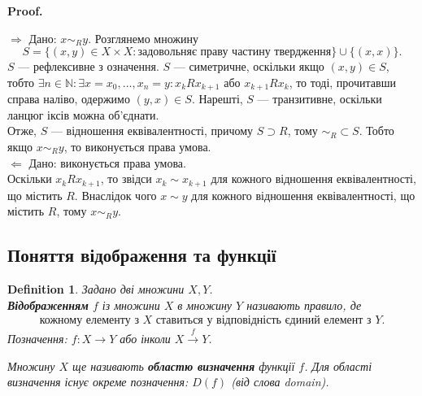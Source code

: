 \documentclass[a4paper, 14pt]{extarticle}
\makeatletter
\def\rightproof{$\boxed{\Rightarrow}$ }
\def\leftproof{$\boxed{\Leftarrow}$ }
\theoremstyle{theoremdd}
\theoremstyle{theoremdd}
\newtheorem{definition}[theorem]{Definition}
\theoremstyle{theoremdd}
\theoremstyle{theoremdd}
\theoremstyle{theoremdd}
\theoremstyle{theoremdd}
\theoremstyle{theoremdd}
\theoremstyle{theoremdd}
\theoremstyle{theoremdd}
\theoremstyle{theoremdd}
\theoremstyle{theoremdd}
\theoremstyle{theoremdd}
\theoremstyle{theoremdd}
\theoremstyle{theoremdd}
\theoremstyle{theoremdd}
\renewenvironment{proof}[1][Proof.\\]{\par
\pushQED{\hfill \qed}%
\normalfont \topsep6\p@\@plus6\p@\relax
\trivlist
\item\relax
{\bfseries
#1\@addpunct{.}}\hspace\labelsep\ignorespaces
}{%
\popQED\endtrivlist\@endpefalse
}
\makeatother
\begin{document}
\begin{proof}
\rightproof Дано: $x \sim_R y$. Розглянемо множину
\[
S = \{ (x,y) \in X \times X: \text{задовольняє праву частину твердження} \} \cup \{(x,x)\}.
\]
$S$ --- рефлексивне з означення. $S$ --- симетричне, оскільки якщо $(x,y) \in S$, тобто $\exists n \in \mathbb{N}: \exists x = x_0,\dots, x_n = y: x_kRx_{k+1}$ або $x_{k+1} R x_k$, то тоді, прочитавши справа наліво, одержимо $(y,x) \in S$. Нарешті, $S$ --- транзитивне, оскільки ланцюг іксів можна об'єднати.\\
Отже, $S$ --- відношення еквівалентності, причому $S \supset R$, тому $\sim_R \subset S$. Тобто якщо $x \sim_R y$, то виконується права умова.
\bigskip \\
\leftproof Дано: виконується права умова.\\
Оскільки $x_k R x_{k+1}$, то звідси $x_k \sim x_{k+1}$ для кожного відношення еквівалентності, що містить $R$. Внаслідок чого $x \sim y$ для кожного відношення еквівалентності, що містить $R$, тому $x \sim_R y$.
\end{proof}

\subsection{Поняття відображення та функції}
	\begin{definition}
	Задано дві множини $X,Y$.\\
	\textbf{Відображенням} $f$ із множини $X$ в множину $Y$ називають правило, де
	\begin{align*}
	\text{кожному елементу з $X$ ставиться у відповідність єдиний елемент з $Y$.}
	\end{align*}
	Позначення: $f \colon X \to Y$ або інколи $X \xrightarrow{f} Y$.
	\begin{figure}[H]
\end{figure}
	Множину $X$ ще називають \textbf{областю визначення} функції $f$. Для області визначення існує окреме позначення: $D(f)$ (від слова domain).
	\end{definition}
	
\end{document}
